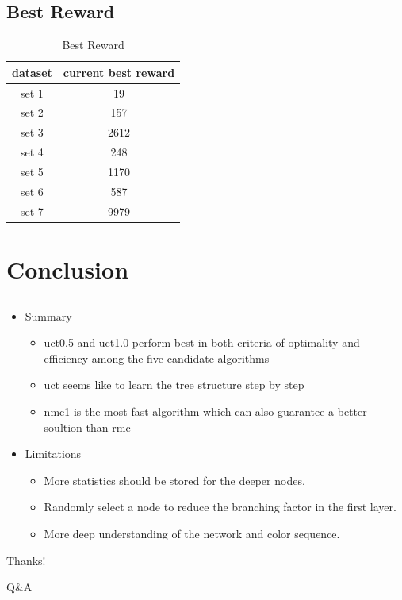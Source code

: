 \documentclass[compress]{beamer}
\begin{document}
\subsection{Best Reward}

\begin{frame}
\begin{table}[htbp]
  \centering
  \caption{Best Reward}
    \begin{tabular}{cc}
    \toprule
    dataset & current best reward \\
    \midrule
    set 1 & 19 \\
    set 2 & 157 \\
    set 3 & 2612 \\
    set 4 & 248 \\
    set 5 & 1170 \\
    set 6 & 587 \\
    set 7 & 9979 \\
    \bottomrule
    \end{tabular}%
  \label{tab:best_rewards}%
\end{table}%
\end{frame}

\section{Conclusion}

\subsection{}

\begin{frame}
\begin{itemize}
  \item Summary
    \begin{itemize}
      \item uct0.5 and uct1.0 perform best in both criteria of optimality and efficiency among the five candidate algorithms
      \item uct seems like to learn the tree structure step by step 
      \item nmc1 is the most fast algorithm which can also guarantee a better soultion than rmc
    \end{itemize}
  \item Limitations
    \begin{itemize}
      \item More statistics should be stored for the deeper nodes.
      \item Randomly select a node to reduce the branching factor in the first layer.
      \item More deep understanding of the network and color sequence.
    \end{itemize}
\end{itemize}
\end{frame}

\begin{frame}
\Huge{\centerline{Thanks!}}
\centerline{Q\&A}
\end{frame}
\end{document}

